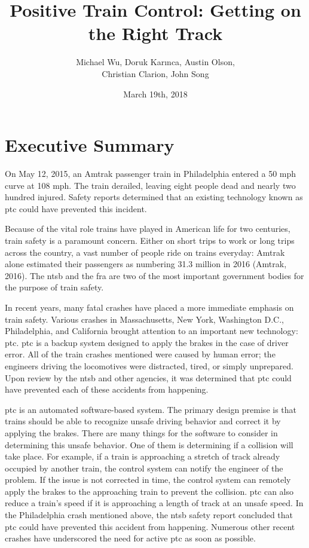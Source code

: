 \documentclass[11pt, titlepage]{article}
\title{Positive Train Control: Getting on the Right Track}
\author{Michael Wu, Doruk Karınca, Austin Olson,\\Christian Clarion, John Song}
\date{March 19th, 2018}
\newcommand\frontmatter{
    \cleardoublepage
  \pagenumbering{roman}}
\newcommand\mainmatter{
    \cleardoublepage
  \pagenumbering{arabic}}
\begin{document}
\maketitle

\frontmatter
\tableofcontents
\listoffigures
\listoftables

\mainmatter
\section{Executive Summary}

On May 12, 2015, an Amtrak passenger train in Philadelphia entered a 50 mph
curve at 108 mph. The train derailed, leaving eight people dead and nearly two
hundred injured. Safety reports determined that an existing technology known
as \gls{ptc} could have prevented this incident.

Because of the vital role trains have played in American life for two
centuries, train safety is a paramount concern. Either on short trips to work
or long trips across the country, a vast number of people ride on trains
everyday: Amtrak alone estimated their passengers as numbering 31.3 million in
2016 (Amtrak, 2016). The \gls{ntsb} and the \gls{fra} are two of the most
important government bodies for the purpose of train safety.

In recent years, many fatal crashes have placed a more immediate emphasis on
train safety. Various crashes in Massachusetts, New York, Washington D.C.,
Philadelphia, and California brought attention to an important new technology:
\gls{ptc}. \gls{ptc} is a backup system designed to apply the brakes in the
case of driver error. All of the train crashes mentioned were caused by human
error; the engineers driving the locomotives were distracted, tired, or simply
unprepared. Upon review by the \gls{ntsb} and other agencies, it was
determined that \gls{ptc} could have prevented each of these accidents from
happening.

\gls{ptc} is an automated software-based system. The primary design premise is
that trains should be able to recognize unsafe driving behavior and correct it
by applying the brakes. There are many things for the software to consider in
determining this unsafe behavior. One of them is determining if a collision
will take place. For example, if a train is approaching a stretch of track
already occupied by another train, the control system can notify the engineer
of the problem. If the issue is not corrected in time, the control system can
remotely apply the brakes to the approaching train to prevent the collision.
\gls{ptc} can also reduce a train’s speed if it is approaching a length of
track at an unsafe speed. In the Philadelphia crash mentioned above, the
\gls{ntsb} safety report concluded that \gls{ptc} could have prevented this
accident from happening. Numerous other recent crashes have underscored the need
for active \gls{ptc} as soon as possible.
\end{document}
